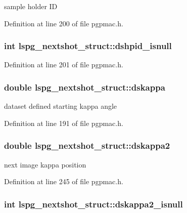 sample holder ID 

Definition at line 200 of file pgpmac.h.\hypertarget{structlspg__nextshot__struct_afe16be0382423aa3f25cb3d6cf99430b}{
\subsubsection[{dshpid\_\-isnull}]{\setlength{\rightskip}{0pt plus 5cm}int {\bf lspg\_\-nextshot\_\-struct::dshpid\_\-isnull}}}
\label{structlspg__nextshot__struct_afe16be0382423aa3f25cb3d6cf99430b}


Definition at line 201 of file pgpmac.h.\hypertarget{structlspg__nextshot__struct_a59355281e8eb935cd7bfac597fdc5289}{
\subsubsection[{dskappa}]{\setlength{\rightskip}{0pt plus 5cm}double {\bf lspg\_\-nextshot\_\-struct::dskappa}}}
\label{structlspg__nextshot__struct_a59355281e8eb935cd7bfac597fdc5289}


dataset defined starting kappa angle 

Definition at line 191 of file pgpmac.h.\hypertarget{structlspg__nextshot__struct_a8571a0b95fb6ea6356fd7204b9c9e371}{
\subsubsection[{dskappa2}]{\setlength{\rightskip}{0pt plus 5cm}double {\bf lspg\_\-nextshot\_\-struct::dskappa2}}}
\label{structlspg__nextshot__struct_a8571a0b95fb6ea6356fd7204b9c9e371}


next image kappa position 

Definition at line 245 of file pgpmac.h.\hypertarget{structlspg__nextshot__struct_a9a7e47372f4f6e0e48a0cb3c78fa8437}{
\subsubsection[{dskappa2\_\-isnull}]{\setlength{\rightskip}{0pt plus 5cm}int {\bf lspg\_\-nextshot\_\-struct::dskappa2\_\-isnull}}}
\label{structlspg__nextshot__struct_a9a7e47372f4f6e0e48a0cb3c78fa8437}


